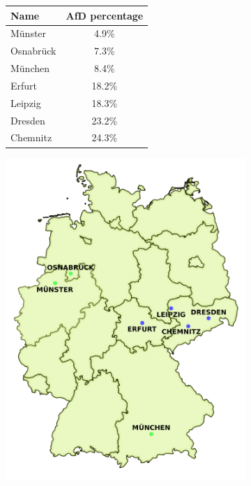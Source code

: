 \documentclass[11pt]{scrartcl}
\begin{document}
\begin{figure}[H]
    \centering
    \begin{subfigure}{.4\textwidth}
    \centering
 \begin{tabular}{!{\vrule width 3pt}l c!{\vrule width 3pt}}
 \hline
 Name & AfD percentage \\ [0.7ex] 
 \hline\hline
 Münster & 4.9\% \\ 
 \hline
 Osnabrück & 7.3\% \\
 \hline
 München & 8.4\% \\
 \hline\hline
 Erfurt & 18.2\% \\
 \hline
 Leipzig & 18.3\% \\ 
 \hline
 Dresden & 23.2\% \\
 \hline
 Chemnitz & 24.3\% \\ [0.5ex] 
 \hline
\end{tabular}
\end{subfigure}
\begin{subfigure}{0.59\textwidth}
\centering
\includegraphics[width=\linewidth]{images/Deutschland.png}
\end{subfigure}
\end{figure}
\end{document}
